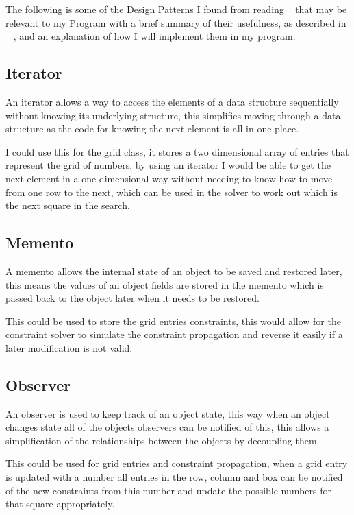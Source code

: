 \documentclass[]{final_report}
\begin{document}
The following is some of the Design Patterns I found from reading ~\cite{GAMMA:1995} that may be relevant to my Program with a brief summary of their usefulness, as described in ~\cite{GAMMA:1995} , and an explanation of how I will implement them in my program.

\subsection*{Iterator}

An iterator allows a way to access the elements of a data structure sequentially without knowing its underlying structure, this simplifies moving through a data structure as the code for knowing the next element is all in one place.

I could use this for the grid class, it stores a two dimensional array of entries that represent the grid of numbers, by using an iterator I would be able to get the next element in a one dimensional way without needing to know how to move from one row to the next, which can be used in the solver to work out which is the next square in the search.

\subsection*{Memento}

A memento allows the internal state of an object to be saved and restored later, this means the values of an object fields are stored in the memento which is passed back to the object later when it needs to be restored.

This could be used to store the grid entries constraints, this would allow for the constraint solver to simulate the constraint propagation and reverse it easily if a later modification is not valid.

\subsection*{Observer}

An observer is used to keep track of an object state, this way when an object changes state all of the objects observers can be notified of this, this allows a simplification of the relationships between the objects by decoupling them.

This could be used for grid entries and constraint propagation, when a grid entry is updated with a number all entries in the row, column and box can be notified of the new constraints from this number and update the possible numbers for that square appropriately.
\end{document}

